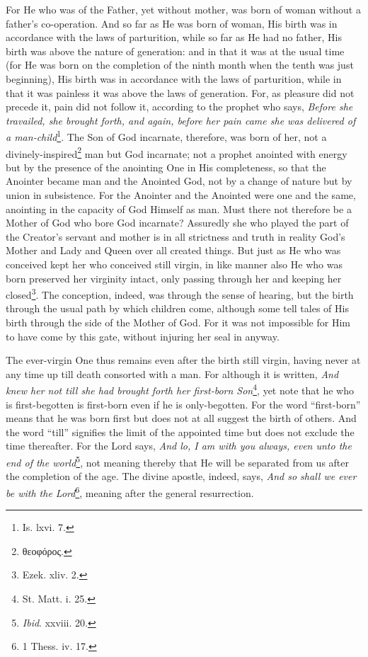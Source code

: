 For He who was of the Father, yet without mother, was born of woman without a father’s co-operation. And so far as He was born of woman, His birth was in accordance with the laws of parturition, while so far as He had no father, His birth was above the nature of generation: and in that it was at the usual time (for He was born on the completion of the ninth month when the tenth was just beginning), His birth was in accordance with the laws of parturition, while in that it was painless it was above the laws of generation. For, as pleasure did not precede it, pain did not follow it, according to the prophet who says, \emph{Before she travailed, she brought forth, and again, before her pain came she was delivered of a man-child}\footnote{Is. lxvi. 7.}. The Son of God incarnate, therefore, was born of her, not a divinely-inspired\footnote{\textgreek{θεοφόρος}.} man but God incarnate; not a prophet anointed with energy but by the presence of the anointing One in His completeness, so that the Anointer became man and the Anointed God, not by a change of nature but by union in subsistence. For the Anointer and the Anointed were one and the same, anointing in the capacity of God Himself as man. Must there not therefore be a Mother of God who bore God incarnate? Assuredly she who played the part of the Creator’s servant and mother is in all strictness and truth in reality God’s Mother and Lady and Queen over all created things. But just as He who was conceived kept her who conceived still virgin, in like manner also He who was born preserved her virginity intact, only passing through her and keeping her closed\footnote{Ezek. xliv. 2.}. The conception, indeed, was through the sense of hearing, but the birth through the usual path by which children come, although some tell tales of His birth through the side of the Mother of God. For it was not impossible for Him to have come by this gate, without injuring her seal in anyway.

The ever-virgin One thus remains even after the birth still virgin, having never at any time up till death consorted with a man. For although it is written, \emph{And knew her not till she had brought forth her first-born Son}\footnote{St. Matt. i. 25.}, yet note that he who is first-begotten is first-born even if he is only-begotten. For the word “first-born” means that he was born first but does not at all suggest the birth of others. And the word “till” signifies the limit of the appointed time but does not exclude the time thereafter. For the Lord says, \emph{And lo, I am with you always, even unto the end of the world}\footnote{\emph{Ibid}. xxviii. 20.}, not meaning thereby that He will be separated from us after the completion of the age. The divine apostle, indeed, says, \emph{And so shall we ever be with the Lord}\footnote{1 Thess. iv. 17.}, meaning after the general resurrection.

